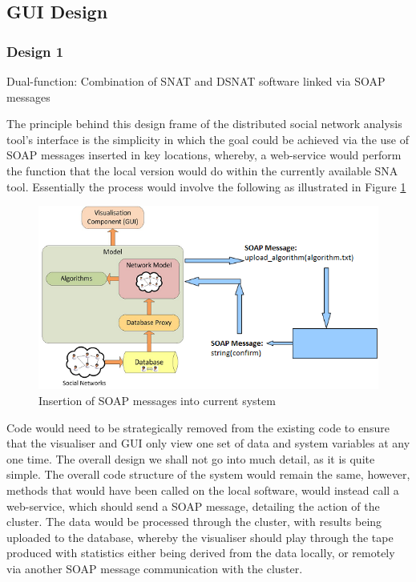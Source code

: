 \subsection{GUI Design}

\subsubsection{Design 1}
Dual-function: Combination of SNAT and DSNAT software linked via SOAP messages

The principle behind this design frame of the distributed social network analysis tool's interface is the simplicity in which the goal could be achieved via the use of SOAP messages inserted in key locations, whereby, a web-service would perform the function that the local version would do within the currently available SNA tool. Essentially the process would involve the following as illustrated in Figure \ref{fig:des1}

\begin{figure}[htbp]%
\centering
\includegraphics[width=0.6\columnwidth]{./img/des1}%
\caption{Insertion of SOAP messages into current system}%
\label{fig:des1}%
\end{figure}

Code would need to be strategically removed from the existing code to ensure that the visualiser and GUI only view one set of data and system variables at any one time. The overall design we shall not go into much detail, as it is quite simple. The overall code structure of the system would remain the same, however, methods that would have been called on the local software, would instead call a web-service, which should send a SOAP message, detailing the action of the cluster. The data would be processed through the cluster, with results being uploaded to the database, whereby the visualiser should play through the tape produced with statistics either being derived from the data locally, or remotely via another SOAP message communication with the cluster.

